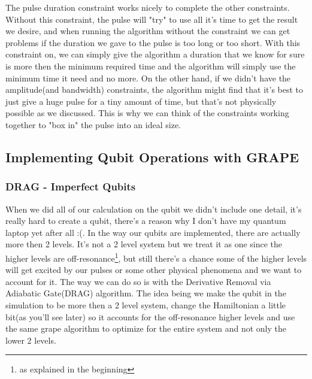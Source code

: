 \documentclass[english, a4paper, 12pt, twoside]{article}
\numberwithin{equation}{section} %
\begin{document}
The pulse duration constraint works nicely to complete the other constraints. Without this constraint, the pulse will "try" to use all it's time to get the result we desire, and when running the algorithm without the constraint we can get problems if the duration we gave to the pulse is too long or too short. With this constraint on, we can simply give the algorithm a duration that we know for sure is more then the minimum required time and the algorithm will simply use the minimum time it need and no more. On the other hand, if we didn't have the amplitude(and bandwidth) constraints, the algorithm might find that it's best to just give a huge pulse for a tiny amount of time, but that's not physically possible as we discussed. This is why we can think of the constraints working together to "box in" the pulse into an ideal size.
\subsection{Implementing Qubit Operations with GRAPE}

\subsubsection{DRAG - Imperfect Qubits}
When we did all of our calculation on the qubit we didn't include one detail, it's really hard to create a qubit, there's a reason why I don't have my quantum laptop yet after all :(. In the way our qubits are implemented, there are actually more then 2 levels. It's not a 2 level system but we treat it as one since the higher levels are off-resonance\footnote{as explained in the beginning}, but still there's a chance some of the higher levels will get excited by our pulses or some other physical phenomena and we want to account for it. The way we can do so is with the Derivative Removal via Adiabatic Gate(DRAG) algorithm. The idea being we make the qubit in the simulation to be more then a 2 level system, change the Hamiltonian a little bit(as you'll see later) so it accounts for the off-resonance higher levels and use the same grape algorithm to optimize for the entire system and not only the lower 2 levels.
\end{document}
